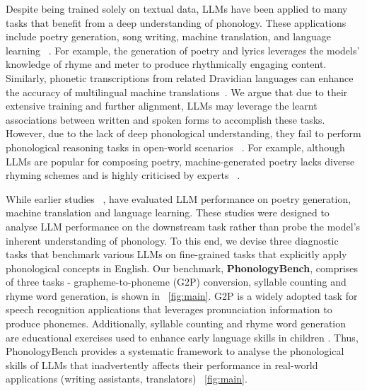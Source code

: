 Despite being trained solely on textual data, LLMs have been applied to many tasks that benefit from a deep understanding of phonology. These applications include poetry generation, song writing, machine translation, and language learning ~\citep{ding2024songcomposer, kwon2023interfaces, yu2024token}. For example, the generation of poetry and lyrics leverages the models' knowledge of rhyme and meter to produce rhythmically engaging content. Similarly, phonetic transcriptions from related Dravidian languages can enhance the accuracy of multilingual machine translations~\citep{chakravarthi2019multilingual}. We argue that due to their extensive training and further alignment, LLMs may leverage the learnt associations between written and spoken forms to accomplish these tasks. However, due to the lack of deep phonological understanding, they fail to perform phonological reasoning tasks in open-world scenarios ~\citep{peng2023spoken}. For example, although LLMs are popular for composing poetry, machine-generated poetry lacks diverse rhyming schemes and is highly criticised by experts ~\citep{vice_poem}.

While earlier studies ~\citep{jiao2023chatgpt,sawicki2023bits, peng2023spoken}, have  evaluated LLM performance on poetry generation, machine translation and language learning. These studies were designed to analyse LLM performance on the downstream task rather than probe the model's inherent understanding of phonology. To this end, we devise three diagnostic tasks that benchmark various LLMs on fine-grained tasks that explicitly apply phonological concepts in English. Our benchmark, \textbf{PhonologyBench}, comprises of three tasks - grapheme-to-phoneme (G2P) conversion, syllable counting and rhyme word generation, is shown in ~\autoref{fig:main}. G2P is a widely adopted task for speech recognition applications that leverages pronunciation information to produce phonemes. Additionally, syllable counting and rhyme word generation are educational exercises used to enhance early language skills in children \citep{bruck1995phonological}. Thus, PhonologyBench provides a systematic framework to analyse the phonological skills of LLMs that inadvertently affects their performance in real-world applications (writing assistants, translators) ~\autoref{fig:main}. 

